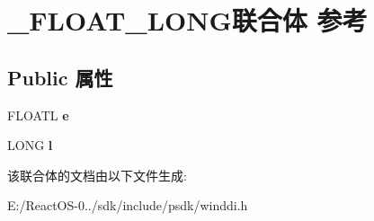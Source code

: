 \hypertarget{union___f_l_o_a_t___l_o_n_g}{}\section{\+\_\+\+F\+L\+O\+A\+T\+\_\+\+L\+O\+N\+G联合体 参考}
\label{union___f_l_o_a_t___l_o_n_g}
\subsection*{Public 属性}
\begin{DoxyCompactItemize}
\item 
\mbox{\label{union___f_l_o_a_t___l_o_n_g_abdec6e252886a62b0b083dc213dcfe76}} 
F\+L\+O\+A\+TL {\bfseries e}
\item 
\mbox{\label{union___f_l_o_a_t___l_o_n_g_a0a018e1151505bb73fe2012d629bdd62}} 
L\+O\+NG {\bfseries l}
\end{DoxyCompactItemize}


该联合体的文档由以下文件生成\+:\begin{DoxyCompactItemize}
\item 
E\+:/\+React\+O\+S-\/0../sdk/include/psdk/winddi.\+h\end{DoxyCompactItemize}
